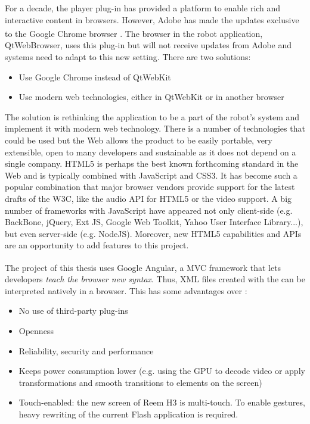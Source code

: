 For a decade, the \flash player plug-in has provided a platform to enable rich and interactive content in browsers.
However, Adobe has made the updates exclusive to the Google Chrome\textsuperscript{\textcopyright}\xspace browser \cite{FlashRoadmap}. 
The browser in the robot application, QtWebBrowser, uses this plug-in but will not receive updates from Adobe and \company systems need to adapt to this new setting. 
There are two solutions:
\begin{itemize}
	\item Use Google Chrome instead of QtWebKit
	\item Use modern web technologies, either in QtWebKit or in another browser
\end{itemize}

The solution is rethinking the application to be a part of the robot's system and implement it with modern web technology.
There is a number of technologies that could be used but the Web allows the product to be easily portable, very extensible, open to many developers and sustainable as it does not depend on a single company.
\ac{HTML5} is perhaps the best known forthcoming standard in the Web and is typically combined with JavaScript and \ac{CSS3}. 
It has become such a popular combination that major browser vendors provide support for the latest drafts of the \ac{W3C}, like the audio \ac{API} for \ac{HTML5} or the video support.
A big number of frameworks with JavaScript have appeared not only client-side (e.g. BackBone, jQuery, Ext JS, Google Web Toolkit, Yahoo User Interface Library...), but even server-side (e.g. NodeJS).
Moreover, new \ac{HTML5} capabilities and \acp{API} are an opportunity to add features to this project.

The project of this thesis uses Google Angular\textsuperscript{\textcopyright}, a \ac{MVC} framework that lets developers \emph{teach the browser new syntax}. 
Thus, \ac{XML} files created with the \se can be interpreted natively in a browser. 
This has some advantages over \flash \cite{Jobs:ThoughtsOnFlash}:
\begin{itemize}
    \item No use of third-party plug-ins
    \item Openness
    \item Reliability, security and performance
    \item Keeps power consumption lower (e.g. using the GPU to decode video or apply transformations and smooth transitions to elements on the screen)
    \item Touch-enabled: the new screen of Reem H3 is multi-touch. To enable gestures, heavy rewriting of the current Flash application is required.
\end{itemize}


